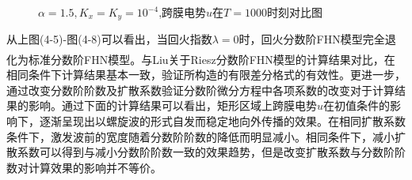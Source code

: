 \documentclass[twoside,UTF8]{nputhesis}
\newcommand{\upcite}[1]{\textsuperscript{\textsuperscript{\cite{#1}}}}
\begin{document}
\begin{figure}[htbp]
	\setlength{\abovecaptionskip}{-0.2cm} %
	\caption{$\alpha = 1.5,K_{x} = K_{y} = {10}^{-4}$,跨膜电势$u$在$T=1000$时刻对比图}
	\label{fig:1d}
	\vspace{-0.5cm} %

\end{figure}


从上图(4-5)-图(4-8)可以看出，当回火指数$\lambda=0$时，回火分数阶FHN模型完全退化为标准分数阶FHN模型。与Liu关于Riesz分数阶FHN模型的计算结果对比\upcite{liu2013numerical}，在相同条件下计算结果基本一致，验证所构造的有限差分格式的有效性。更进一步，通过改变分数阶阶数及扩散系数验证分数阶微分方程中各项系数的改变对于计算结果的影响。通过下面的计算结果可以看出，矩形区域上跨膜电势$u$在初值条件的影响下，逐渐呈现出以螺旋波的形式自发而稳定地向外传播的效果。在相同扩散系数条件下，激发波前的宽度随着分数阶阶数的降低而明显减小。相同条件下，减小扩散系数可以得到与减小分数阶阶数一致的效果趋势，但是改变扩散系数与分数阶阶数对计算效果的影响并不等价。
\end{document}

